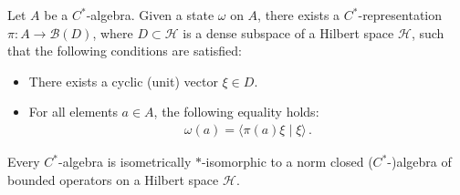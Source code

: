     \begin{construct}\label{operators:gns}
        Let $A$ be a $C^*$-algebra. Given a state $\omega$ on $A$, there exists a $C^*$-representation $\pi:A\rightarrow\mathcal{B}(D)$, where $D\subset\mathcal{H}$ is a dense subspace of a Hilbert space $\mathcal{H}$, such that the following conditions are satisfied:
        \begin{itemize}
            \item There exists a cyclic (unit) vector $\xi\in D$.
            \item For all elements $a\in A$, the following equality holds:
                \begin{gather}
                    \omega(a) = \langle\pi(a)\xi\mid\xi\rangle\,.
                \end{gather}
        \end{itemize}

    \end{construct}

    \begin{theorem}\label{operators:gelfand_naimark}
        Every $C^*$-algebra is isometrically $\ast$-isomorphic to a norm closed ($C^*$-)algebra of bounded operators on a Hilbert space $\mathcal{H}$.
    \end{theorem}

